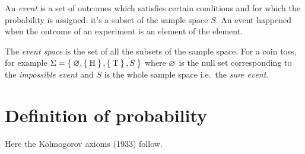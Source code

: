 An \emph{event} is a set of outcomes which satisfies certain conditions and for which the probability is assigned: it's a subset of the sample space $S$.
An event happened when the outcome of an experiment is an element of the element.




The \emph{event space} is the set of all the subsets of the sample space.
For a coin toss, for example $\Sigma = \Set{\ensuremath{\varnothing},\Set{\text{H}},\Set{\text{T}}, S}$ where $\varnothing$ is the null set corresponding to the \emph{impossible event} and $S$ is the whole sample space i.e.~the \emph{sure event}.

\section{Definition of probability}

Here the Kolmogorov axioms (1933) follow.

